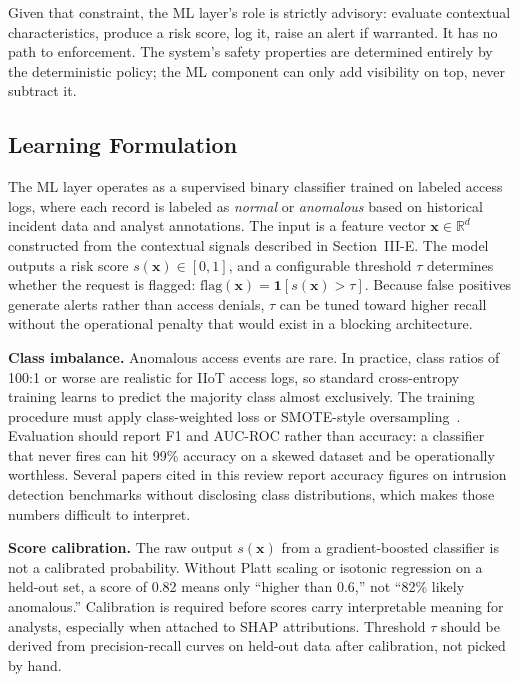 \documentclass[conference]{IEEEtran}
\begin{document}
Given that constraint, the ML layer's role is strictly advisory: evaluate contextual characteristics, produce a risk score, log it, raise an alert if warranted. It has no path to enforcement. The system's safety properties are determined entirely by the deterministic policy; the ML component can only add visibility on top, never subtract it.

\subsection{Learning Formulation}

The ML layer operates as a supervised binary classifier trained on labeled access logs, where each record is labeled as \textit{normal} or \textit{anomalous} based on historical incident data and analyst annotations. The input is a feature vector $\mathbf{x} \in \mathbb{R}^d$ constructed from the contextual signals described in Section~III-E. The model outputs a risk score $s(\mathbf{x}) \in [0, 1]$, and a configurable threshold $\tau$ determines whether the request is flagged: $\text{flag}(\mathbf{x}) = \mathbf{1}[s(\mathbf{x}) > \tau]$. Because false positives generate alerts rather than access denials, $\tau$ can be tuned toward higher recall without the operational penalty that would exist in a blocking architecture.

\textbf{Class imbalance.} Anomalous access events are rare. In practice, class ratios of 100:1 or worse are realistic for IIoT access logs, so standard cross-entropy training learns to predict the majority class almost exclusively. The training procedure must apply class-weighted loss or SMOTE-style oversampling~\cite{ali2024}. Evaluation should report F1 and AUC-ROC rather than accuracy: a classifier that never fires can hit 99\% accuracy on a skewed dataset and be operationally worthless. Several papers cited in this review report accuracy figures on intrusion detection benchmarks without disclosing class distributions, which makes those numbers difficult to interpret.

\textbf{Score calibration.} The raw output $s(\mathbf{x})$ from a gradient-boosted classifier is not a calibrated probability. Without Platt scaling or isotonic regression on a held-out set, a score of 0.82 means only ``higher than 0.6,'' not ``82\% likely anomalous.'' Calibration is required before scores carry interpretable meaning for analysts, especially when attached to SHAP attributions. Threshold $\tau$ should be derived from precision-recall curves on held-out data after calibration, not picked by hand.
\end{document}
